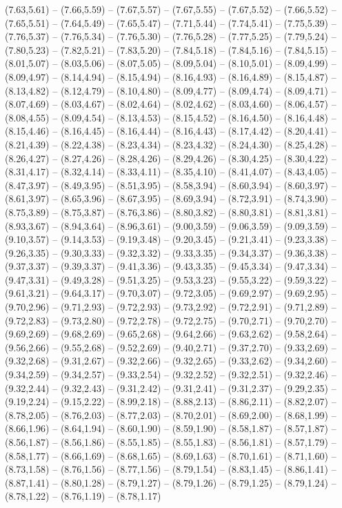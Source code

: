 \expandafter\def\csname geo:gebiet:DE-BY\endcsname{
  (7.63,5.61) -- (7.66,5.59) -- (7.67,5.57) -- (7.67,5.55) -- (7.67,5.52) -- (7.66,5.52) -- (7.65,5.51) -- (7.64,5.49) -- (7.65,5.47) -- (7.71,5.44) -- (7.74,5.41) -- (7.75,5.39) -- (7.76,5.37) -- (7.76,5.34) -- (7.76,5.30) -- (7.76,5.28) -- (7.77,5.25) -- (7.79,5.24) -- (7.80,5.23) -- (7.82,5.21) -- (7.83,5.20) -- (7.84,5.18) -- (7.84,5.16) -- (7.84,5.15) -- (8.01,5.07) -- (8.03,5.06) -- (8.07,5.05) -- (8.09,5.04) -- (8.10,5.01) -- (8.09,4.99) -- (8.09,4.97) -- (8.14,4.94) -- (8.15,4.94) -- (8.16,4.93) -- (8.16,4.89) -- (8.15,4.87) -- (8.13,4.82) -- (8.12,4.79) -- (8.10,4.80) -- (8.09,4.77) -- (8.09,4.74) -- (8.09,4.71) -- (8.07,4.69) -- (8.03,4.67) -- (8.02,4.64) -- (8.02,4.62) -- (8.03,4.60) -- (8.06,4.57) -- (8.08,4.55) -- (8.09,4.54) -- (8.13,4.53) -- (8.15,4.52) -- (8.16,4.50) -- (8.16,4.48) -- (8.15,4.46) -- (8.16,4.45) -- (8.16,4.44) -- (8.16,4.43) -- (8.17,4.42) -- (8.20,4.41) -- (8.21,4.39) -- (8.22,4.38) -- (8.23,4.34) -- (8.23,4.32) -- (8.24,4.30) -- (8.25,4.28) -- (8.26,4.27) -- (8.27,4.26) -- (8.28,4.26) -- (8.29,4.26) -- (8.30,4.25) -- (8.30,4.22) -- (8.31,4.17) -- (8.32,4.14) -- (8.33,4.11) -- (8.35,4.10) -- (8.41,4.07) -- (8.43,4.05) -- (8.47,3.97) -- (8.49,3.95) -- (8.51,3.95) -- (8.58,3.94) -- (8.60,3.94) -- (8.60,3.97) -- (8.61,3.97) -- (8.65,3.96) -- (8.67,3.95) -- (8.69,3.94) -- (8.72,3.91) -- (8.74,3.90) -- (8.75,3.89) -- (8.75,3.87) -- (8.76,3.86) -- (8.80,3.82) -- (8.80,3.81) -- (8.81,3.81) -- (8.93,3.67) -- (8.94,3.64) -- (8.96,3.61) -- (9.00,3.59) -- (9.06,3.59) -- (9.09,3.59) -- (9.10,3.57) -- (9.14,3.53) -- (9.19,3.48) -- (9.20,3.45) -- (9.21,3.41) -- (9.23,3.38) -- (9.26,3.35) -- (9.30,3.33) -- (9.32,3.32) -- (9.33,3.35) -- (9.34,3.37) -- (9.36,3.38) -- (9.37,3.37) -- (9.39,3.37) -- (9.41,3.36) -- (9.43,3.35) -- (9.45,3.34) -- (9.47,3.34) -- (9.47,3.31) -- (9.49,3.28) -- (9.51,3.25) -- (9.53,3.23) -- (9.55,3.22) -- (9.59,3.22) -- (9.61,3.21) -- (9.64,3.17) -- (9.70,3.07) -- (9.72,3.05) -- (9.69,2.97) -- (9.69,2.95) -- (9.70,2.96) -- (9.71,2.93) -- (9.72,2.93) -- (9.73,2.92) -- (9.72,2.91) -- (9.71,2.89) -- (9.72,2.83) -- (9.73,2.80) -- (9.72,2.78) -- (9.72,2.75) -- (9.70,2.71) -- (9.70,2.70) -- (9.69,2.69) -- (9.68,2.69) -- (9.65,2.68) -- (9.64,2.66) -- (9.63,2.62) -- (9.58,2.64) -- (9.56,2.66) -- (9.55,2.68) -- (9.52,2.69) -- (9.40,2.71) -- (9.37,2.70) -- (9.33,2.69) -- (9.32,2.68) -- (9.31,2.67) -- (9.32,2.66) -- (9.32,2.65) -- (9.33,2.62) -- (9.34,2.60) -- (9.34,2.59) -- (9.34,2.57) -- (9.33,2.54) -- (9.32,2.52) -- (9.32,2.51) -- (9.32,2.46) -- (9.32,2.44) -- (9.32,2.43) -- (9.31,2.42) -- (9.31,2.41) -- (9.31,2.37) -- (9.29,2.35) -- (9.19,2.24) -- (9.15,2.22) -- (8.99,2.18) -- (8.88,2.13) -- (8.86,2.11) -- (8.82,2.07) -- (8.78,2.05) -- (8.76,2.03) -- (8.77,2.03) -- (8.70,2.01) -- (8.69,2.00) -- (8.68,1.99) -- (8.66,1.96) -- (8.64,1.94) -- (8.60,1.90) -- (8.59,1.90) -- (8.58,1.87) -- (8.57,1.87) -- (8.56,1.87) -- (8.56,1.86) -- (8.55,1.85) -- (8.55,1.83) -- (8.56,1.81) -- (8.57,1.79) -- (8.58,1.77) -- (8.66,1.69) -- (8.68,1.65) -- (8.69,1.63) -- (8.70,1.61) -- (8.71,1.60) -- (8.73,1.58) -- (8.76,1.56) -- (8.77,1.56) -- (8.79,1.54) -- (8.83,1.45) -- (8.86,1.41) -- (8.87,1.41) -- (8.80,1.28) -- (8.79,1.27) -- (8.79,1.26) -- (8.79,1.25) -- (8.79,1.24) -- (8.78,1.22) -- (8.76,1.19) -- (8.78,1.17) }
